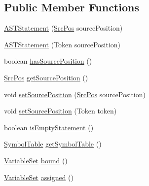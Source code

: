 \subsection*{Public Member Functions}
\begin{DoxyCompactItemize}
\item 
\hyperlink{classorg_1_1tzi_1_1use_1_1parser_1_1soil_1_1ast_1_1_a_s_t_statement_aec68fef8f9aa54e062fd084c5675a441}{A\-S\-T\-Statement} (\hyperlink{classorg_1_1tzi_1_1use_1_1parser_1_1_src_pos}{Src\-Pos} source\-Position)
\item 
\hyperlink{classorg_1_1tzi_1_1use_1_1parser_1_1soil_1_1ast_1_1_a_s_t_statement_a383ff104f644d2ea6155ebaad0f5486e}{A\-S\-T\-Statement} (Token source\-Position)
\item 
boolean \hyperlink{classorg_1_1tzi_1_1use_1_1parser_1_1soil_1_1ast_1_1_a_s_t_statement_a5d723d60a46388b2f0f4ff56acb41914}{has\-Source\-Position} ()
\item 
\hyperlink{classorg_1_1tzi_1_1use_1_1parser_1_1_src_pos}{Src\-Pos} \hyperlink{classorg_1_1tzi_1_1use_1_1parser_1_1soil_1_1ast_1_1_a_s_t_statement_a6638eefae84c946f4d4e70df02acb4c2}{get\-Source\-Position} ()
\item 
void \hyperlink{classorg_1_1tzi_1_1use_1_1parser_1_1soil_1_1ast_1_1_a_s_t_statement_ab711ef064472e517e7b83856eb627317}{set\-Source\-Position} (\hyperlink{classorg_1_1tzi_1_1use_1_1parser_1_1_src_pos}{Src\-Pos} source\-Position)
\item 
void \hyperlink{classorg_1_1tzi_1_1use_1_1parser_1_1soil_1_1ast_1_1_a_s_t_statement_a88db8a7e77604ff06ca5cf9117ea659a}{set\-Source\-Position} (Token token)
\item 
boolean \hyperlink{classorg_1_1tzi_1_1use_1_1parser_1_1soil_1_1ast_1_1_a_s_t_statement_a5953b986776d07253f5ccc2558b95aa2}{is\-Empty\-Statement} ()
\item 
\hyperlink{classorg_1_1tzi_1_1use_1_1util_1_1soil_1_1_symbol_table}{Symbol\-Table} \hyperlink{classorg_1_1tzi_1_1use_1_1parser_1_1soil_1_1ast_1_1_a_s_t_statement_af5867c91c44c55ae40afc3406cc987e4}{get\-Symbol\-Table} ()
\item 
\hyperlink{classorg_1_1tzi_1_1use_1_1util_1_1soil_1_1_variable_set}{Variable\-Set} \hyperlink{classorg_1_1tzi_1_1use_1_1parser_1_1soil_1_1ast_1_1_a_s_t_statement_a244c1a6f73aa34f8a8dff0850460385d}{bound} ()
\item 
\hyperlink{classorg_1_1tzi_1_1use_1_1util_1_1soil_1_1_variable_set}{Variable\-Set} \hyperlink{classorg_1_1tzi_1_1use_1_1parser_1_1soil_1_1ast_1_1_a_s_t_statement_a828c915709b58a3c77a2fdedb32ff746}{assigned} ()

\end{DoxyCompactItemize}
